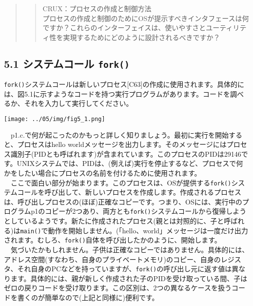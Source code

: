 \begin{quote}
\begin{quote}
CRUX：プロセスの作成と制御方法\\
プロセスの作成と制御のためにOSが提示すべきインタフェースは何ですか？これらのインターフェイスは、使いやすさとユーティリティ性を実現するためにどのように設計されるべきですか？
\end{quote}
\end{quote}

\hypertarget{ux30b7ux30b9ux30c6ux30e0ux30b3ux30fcux30eb-fork}{%
\subsection*{\texorpdfstring{5.1 システムコール
\texttt{fork()}}{5.1 システムコール fork()}}\label{ux30b7ux30b9ux30c6ux30e0ux30b3ux30fcux30eb-fork}}

\texttt{fork()}システムコールは新しいプロセス{[}C63{]}の作成に使用されます。具体的には、図5.1に示すようなコードを持つ実行プログラムがあります。コードを調べるか、それを入力して実行してください。

\texttt{[image: ../05/img/fig5\_1.png]}

　p1.c.で何が起こったのかもっと詳しく知りましょう。最初に実行を開始すると、プロセスはhello
worldメッセージを出力します。そのメッセージにはプロセス識別子(PIDとも呼ばれます)が含まれています。このプロセスのPIDは29146です。UNIXシステムでは、PIDは、(例えば)実行を停止するなど、プロセスで何かをしたい場合にプロセスの名前を付けるために使用されます。\\
　ここで面白い部分が始まります。このプロセスは、OSが提供する\texttt{fork()}システムコールを呼び出して、新しいプロセスを作成します。作成されるプロセスは、呼び出しプロセスの(ほぼ)正確なコピーです。つまり、OSには、実行中のプログラムp1のコピーが2つあり、両方とも\texttt{fork()}システムコールから復帰しようとしているようです。新たに作成されたプロセス(親とは対照的に、子と呼ばれる)は\texttt{main()}で動作を開始しません。(「hello、world」メッセージは一度だけ出力されます。むしろ、\texttt{fork()}自体を呼び出したかのように、開始します。\\
　気づいたかもしれません。子供は正確なコピーではありません。具体的には、アドレス空間(すなわち、自身のプライベートメモリ)のコピー、自身のレジスタ、それ自身のPCなどを持っていますが、\texttt{fork()}の呼び出し元に返す値は異なります。具体的には、親が新しく作成された子のPIDを受け取っている間、子はゼロの戻りコードを受け取ります。この区別は、2つの異なるケースを扱うコードを書くのが簡単なので(上記と同様に)便利です。

